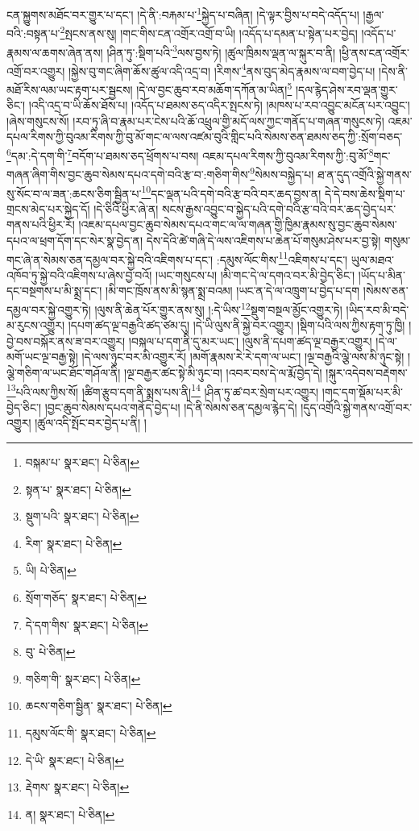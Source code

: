 ངན་སྐྱུགས་མཐོང་བར་གྱུར་པ་དང་། །དེ་ནི་:བརྐམ་པ་\footnote{བསྐམ་པ་  སྣར་ཐང་།  པེ་ཅིན། }སྐྱེད་པ་བཞིན། །དེ་ལྟར་བྱིས་པ་བདེ་འདོད་པ། །རྒྱལ་བའི་:བསྟན་པ་\footnote{སྟན་པ་  སྣར་ཐང་།  པེ་ཅིན། }སྤངས་ནས་སུ། །གང་གིས་ངན་འགྲོར་འགྲོ་བ་ཡི། །འདོད་པ་དམན་པ་སྟེན་པར་བྱེད། །འདོད་པ་རྣམས་ལ་ཆགས་ཞེན་ནས། །ཤིན་ཏུ་:སྡིག་པའི་\footnote{སྡུག་པའི་  སྣར་ཐང་།  པེ་ཅིན། }ལས་བྱས་ཏེ། །ཚུལ་ཁྲིམས་ལྡན་ལ་སྐུར་བ་ནི། །ཕྱི་ནས་ངན་འགྲོར་འགྲོ་བར་འགྱུར། །སྐྱེས་བུ་གང་ཞིག་ཆོས་ཚུལ་འདི་འདྲ་བ། །རིགས་\footnote{རིག་  སྣར་ཐང་།  པེ་ཅིན། }ནས་བུད་མེད་རྣམས་ལ་བག་བྱེད་པ། །དེས་ནི་མཐོ་རིས་ལམ་ཡང་རྟག་པར་སྦྱངས། །དེ་ལ་བྱང་ཆུབ་རབ་མཆོག་དཀོན་མ་ཡིན།\footnote{ཡི།  པེ་ཅིན། } །དལ་རྙེད་ཤེས་རབ་ལྡན་གྱུར་ཅིང་། །འདི་འདྲ་བ་ཡི་ཆོས་ཐོས་པ། །འདོད་པ་ཐམས་ཅད་འདིར་སྤངས་ཏེ། །མཁས་པ་རབ་འབྱུང་མངོན་པར་འབྱུང་། །ཞེས་གསུངས་སོ། །རབ་ཏུ་ཞི་བ་རྣམ་པར་ངེས་པའི་ཆོ་འཕྲུལ་གྱི་མདོ་ལས་ཀྱང་གནོད་པ་གཞན་གསུངས་ཏེ། འཇམ་དཔལ་རིགས་ཀྱི་བུའམ་རིགས་ཀྱི་བུ་མོ་གང་ལ་ལས་འཛམ་བུའི་གླིང་པའི་སེམས་ཅན་ཐམས་ཅད་ཀྱི་:སྲོག་བཅད་\footnote{སྲོག་གཅོད་  སྣར་ཐང་།  པེ་ཅིན། }དམ་:དེ་དག་གི་\footnote{དེ་དག་གིས་  སྣར་ཐང་།  པེ་ཅིན། }བདོག་པ་ཐམས་ཅད་ཕྲོགས་པ་བས། འཇམ་དཔལ་རིགས་ཀྱི་བུའམ་རིགས་ཀྱི་:བུ་མོ་\footnote{བུ་  པེ་ཅིན། }གང་གཞན་ཞིག་གིས་བྱང་ཆུབ་སེམས་དཔའ་དགེ་བའི་རྩ་བ་:གཅིག་གིས་\footnote{གཅིག་གི་  སྣར་ཐང་།  པེ་ཅིན། }སེམས་བསྐྱེད་པ། ཐ་ན་དུད་འགྲོའི་སྐྱེ་གནས་སུ་སོང་བ་ལ་ཟན་:ཆངས་ཅིག་སྦྱིན་པ་\footnote{ཆངས་གཅིག་སྦྱིན་  སྣར་ཐང་།  པེ་ཅིན། }དང་ལྡན་པའི་དགེ་བའི་རྩ་བའི་བར་ཆད་བྱས་ན། དེ་དེ་བས་ཆེས་སྡིག་པ་གྲངས་མེད་པར་སྐྱེད་དོ། །དེ་ཅིའི་ཕྱིར་ཞེ་ན། སངས་རྒྱས་འབྱུང་བ་སྐྱེད་པའི་དགེ་བའི་རྩ་བའི་བར་ཆད་བྱེད་པར་གནས་པའི་ཕྱིར་རོ། །འཇམ་དཔལ་བྱང་ཆུབ་སེམས་དཔའ་གང་ལ་ལ་གཞན་གྱི་ཁྱིམ་རྣམས་སུ་བྱང་ཆུབ་སེམས་དཔའ་ལ་ཕྲག་དོག་དང་སེར་སྣ་བྱེད་ན། དེས་དེའི་ཚེ་གཞི་དེ་ལས་འཇིགས་པ་ཆེན་པོ་གསུམ་ཤེས་པར་བྱ་སྟེ། གསུམ་གང་ཞེ་ན་སེམས་ཅན་དམྱལ་བར་སྐྱེ་བའི་འཇིགས་པ་དང་། :དམུས་ལོང་གིས་\footnote{དམུས་ལོང་གི་  སྣར་ཐང་།  པེ་ཅིན། }འཇིགས་པ་དང་། ཡུལ་མཐའ་འཁོབ་ཏུ་སྐྱེ་བའི་འཇིགས་པ་ཞེས་བྱ་བའོ། །ཡང་གསུངས་པ། །མི་གང་དེ་ལ་དགའ་བར་མི་བྱེད་ཅིང་། །ཡོད་པ་མིན་དང་བསྔགས་པ་མི་སྨྲ་དང་། །མི་གང་ཁྲོས་ནས་མི་སྙན་སྨྲ་བའམ། །ཡང་ན་དེ་ལ་འཁྲུག་པ་བྱེད་པ་དག །སེམས་ཅན་དམྱལ་བར་སྐྱེ་འགྱུར་ཏེ། །ལུས་ནི་ཆེན་པོར་གྱུར་ནས་སུ། །:དེ་ཡིས་\footnote{དེ་ཡི་  སྣར་ཐང་།  པེ་ཅིན། }སྡུག་བསྔལ་མྱོང་འགྱུར་ཏེ། །ཡིད་རབ་མི་བདེ་མ་རུངས་འགྱུར། །དཔག་ཚད་ལྔ་བརྒྱའི་ཚད་ཙམ་དུ། །དེ་ཡི་ལུས་ནི་སྐྱེ་བར་འགྱུར། །སྡིག་པའི་ལས་ཀྱིས་རྟག་ཏུ་ཁྱི། །བྱེ་བས་བསྐོར་ནས་ཟ་བར་འགྱུར། །བསྐལ་པ་དག་ནི་དུ་མར་ཡང་། །ལུས་ནི་དཔག་ཚད་ལྔ་བརྒྱར་འགྱུར། །དེ་ལ་མགོ་ཡང་ལྔ་བརྒྱ་སྟེ། །དེ་ལས་ཉུང་བར་མི་འགྱུར་རོ། །མགོ་རྣམས་རེ་རེ་དག་ལ་ཡང་། །ལྔ་བརྒྱའི་ལྕེ་ལས་མི་ཉུང་སྟེ། །ལྕེ་གཅིག་ལ་ཡང་ཐོང་གཤོལ་ནི། །ལྔ་བརྒྱར་ཚང་སྟེ་མི་ཉུང་བ། །འབར་བས་དེ་ལ་རྨོ་བྱེད་དེ། །སྐུར་འདེབས་བརྡེགས་\footnote{རྡེགས་  སྣར་ཐང་།  པེ་ཅིན། }པའི་ལས་ཀྱིས་སོ། །ཚིག་རྩུབ་དག་ནི་སྨྲས་པས་ནི།\footnote{ན།  སྣར་ཐང་།  པེ་ཅིན། } །ཤིན་ཏུ་ཚ་བར་སྲེག་པར་འགྱུར། །གང་དག་སྡོམ་པར་མི་བྱེད་ཅིང་། །བྱང་ཆུབ་སེམས་དཔའ་གནོད་བྱེད་པ། །དེ་ནི་སེམས་ཅན་དམྱལ་རྙེད་དེ། །དུད་འགྲོའི་སྐྱེ་གནས་འགྲོ་བར་འགྱུར། །ཚུལ་འདི་སྤོང་བར་བྱེད་པ་ནི། །
